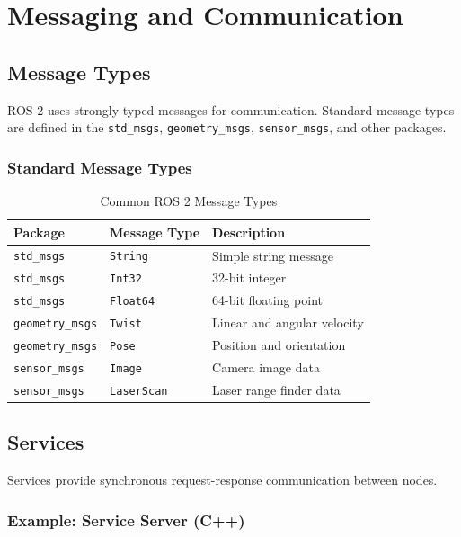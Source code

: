 \documentclass[a4paper,12pt]{book}
\newcommand{\code}[1]{\texttt{#1}}
\begin{document}
\chapter{Messaging and Communication}

\section{Message Types}

ROS 2 uses strongly-typed messages for communication. Standard message types are defined in the \code{std\_msgs}, \code{geometry\_msgs}, \code{sensor\_msgs}, and other packages.

\subsection{Standard Message Types}

\begin{table}[H]
\centering
\begin{tabular}{|l|l|p{6cm}|}
\hline
\textbf{Package} & \textbf{Message Type} & \textbf{Description} \\
\hline
\code{std\_msgs} & \code{String} & Simple string message \\
\hline
\code{std\_msgs} & \code{Int32} & 32-bit integer \\
\hline
\code{std\_msgs} & \code{Float64} & 64-bit floating point \\
\hline
\code{geometry\_msgs} & \code{Twist} & Linear and angular velocity \\
\hline
\code{geometry\_msgs} & \code{Pose} & Position and orientation \\
\hline
\code{sensor\_msgs} & \code{Image} & Camera image data \\
\hline
\code{sensor\_msgs} & \code{LaserScan} & Laser range finder data \\
\hline
\end{tabular}
\caption{Common ROS 2 Message Types}
\label{tab:message_types}
\end{table}

\section{Services}

Services provide synchronous request-response communication between nodes.

\subsection{Example: Service Server (C++)}
\end{document}
